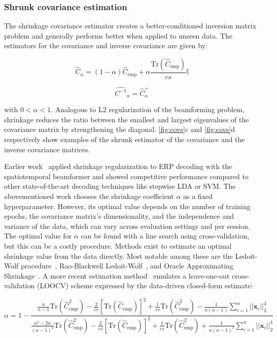 \subsubsection{Shrunk covariance estimation}
\label{sec:shrunk_covariance}
The shrinkage covariance estimator creates a better-conditioned inversion matrix problem and generally performs better when applied to unseen data.
The estimators for the covariance and inverse covariance are given by:

	\begin{equation}
		\hat{C}_\alpha =
		(1-\alpha) \hat{C}_\text{emp}
		+ \alpha\frac{\text{Tr}(\hat{C}_\text{emp})}{cs}\mathbb{I}
		\label{eq:shrinkage}
	\end{equation}


	\begin{equation}
		\widehat{C^{-1}}_\alpha =
		\hat{C}^+_\alpha
		\label{eq:shrinkage_inverse}
	\end{equation}

with $0<\alpha<1$.
Analogous to L2 regularization of the beamforming problem,
shrinkage reduces the ratio between the smallest and largest eigenvalues
of the covariance matrix by strengthening the diagonal.
\autoref{fig:covs}c and \autoref{fig:covs}d respectively show examples of the
shrunk estimator of the covariance and the inverse covariance matrices.

Earlier work~\cite{Libert2021} applied shrinkage regularization to ERP
decoding with the spatiotemporal beamformer and showed competitive performance
compared to other state-of-the-art decoding techniques like stepwise LDA or SVM.
The abovementioned work chooses the shrinkage coefficient $\alpha$ as a fixed hyperparameter.
However, its optimal value depends on the number of training epochs, the
covariance matrix's dimensionality, and the independence and variance of the
data, which can vary across evaluation settings and per session.
The optimal value for $\alpha$ can be found with a line search using cross-validation, but this can be a costly procedure.
Methods exist to estimate an optimal shrinkage value from the data directly.
Most notable among these are the Ledoit-Wolf procedure~\cite{LEDOIT2004365},
Rao-Blackwell Ledoit-Wolf~\cite{chen2010shrinkage}, and Oracle Approximating Shrinkage~\cite{chen2010shrinkage}.
A more recent estimation method~\cite{Tong2018} emulates a leave-one-out
cross-validation (LOOCV) scheme expressed by the data-driven closed-form
estimate:

	\begin{equation}
		\alpha =
		1-\frac{
			\frac{n}{n-1}\text{Tr}(\hat{C}_\text{emp}^2)
			- \frac{2}{cs}\left[\text{Tr}(\hat{C}_\text{emp})\right]^2
			+ \frac{1}{cs}\text{Tr}(\hat{C}_\text{emp}^2)
			- \frac{1}{n(n-1)}\sum_{i=1}^n||\mathbf{x}_i||_2^4
		}
		{
			\frac{n^2 -2n}{(n-1)^2}\text{Tr}(\hat{C}_\text{emp}^2)
			- \frac{2}{cs}\left[\text{Tr}(\hat{C}_\text{emp})\right]^2
			+ \frac{1}{cs}\text{Tr}(\hat{C}_\text{emp}^2)
			+ \frac{1}{n(n-1)^2}\sum_{i=1}^n||\mathbf{x}_i||_2^4
		}
		\label{eq:loocv}
	\end{equation}

